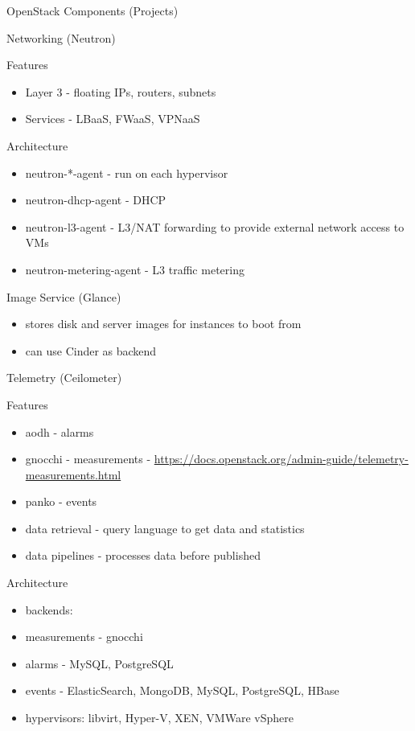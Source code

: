 \documentclass[presentation]{beamer}
\begin{document}
\begin{frame}[fragile,label={sec:orgdf62090}]{OpenStack Components (Projects)}
\begin{block}{Networking (Neutron)}
\begin{block}{Features}
\begin{itemize}
\item Layer 3 - floating IPs, routers, subnets
\item Services - LBaaS, FWaaS, VPNaaS
\end{itemize}
\end{block}
\begin{block}{Architecture}
\begin{itemize}
\item neutron-*-agent - run on each hypervisor
\item neutron-dhcp-agent - DHCP
\item neutron-l3-agent - L3/NAT forwarding to provide external network access to VMs
\item neutron-metering-agent - L3 traffic metering
\end{itemize}
\end{block}
\end{block}
\begin{block}{Image Service (Glance)}
\begin{itemize}
\item stores disk and server images for instances to boot from
\item can use Cinder as backend
\end{itemize}
\end{block}
\begin{block}{Telemetry (Ceilometer)}
\begin{block}{Features}
\begin{itemize}
\item aodh - alarms
\item gnocchi - measurements - \url{https://docs.openstack.org/admin-guide/telemetry-measurements.html}
\item panko - events
\item data retrieval - query language to get data and statistics
\item data pipelines - processes data before published
\end{itemize}
\end{block}
\begin{block}{Architecture}
\begin{itemize}
\item backends:
\item measurements - gnocchi
\item alarms - MySQL, PostgreSQL
\item events - ElasticSearch, MongoDB, MySQL, PostgreSQL, HBase
\item hypervisors: libvirt, Hyper-V, XEN, VMWare vSphere

\end{itemize}
\end{block}
\end{block}
\end{frame}
\end{document}

